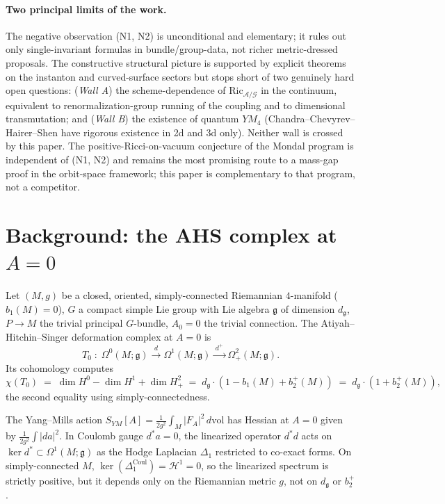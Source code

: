 \documentclass[11pt,letterpaper]{article}
\theoremstyle{definition}
\newcommand{\cA}{\mathcal{A}}
\newcommand{\cG}{\mathcal{G}}
\newcommand{\cH}{\mathcal{H}}
\newcommand{\fg}{\mathfrak{g}}
\newcommand{\Ric}{\mathrm{Ric}}
\newcommand{\dvol}{\,d\mathrm{vol}}
\newcommand{\Lap}{\Delta}
\newcommand{\dimG}{d_{\fg}}
\begin{document}
\paragraph{Two principal limits of the work.} The negative observation (N1, N2) is unconditional and elementary; it rules out only single-invariant formulas in bundle/group-data, not richer metric-dressed proposals. The constructive structural picture is supported by explicit theorems on the instanton and curved-surface sectors but stops short of two genuinely hard open questions: (\emph{Wall A}) the scheme-dependence of $\Ric_{\cA/\cG}$ in the continuum, equivalent to renormalization-group running of the coupling and to dimensional transmutation; and (\emph{Wall B}) the existence of quantum $YM_4$ (Chandra--Chevyrev--Hairer--Shen \cite{CCHS2022, CCHS2024} have rigorous existence in 2d and 3d only). Neither wall is crossed by this paper. The positive-Ricci-on-vacuum conjecture of the Mondal program is independent of (N1, N2) and remains the most promising route to a mass-gap proof in the orbit-space framework; this paper is complementary to that program, not a competitor.

\section{Background: the AHS complex at $A=0$}\label{sec:setup}

Let $(M,g)$ be a closed, oriented, simply-connected Riemannian $4$-manifold ($b_1(M)=0$), $G$ a compact simple Lie group with Lie algebra $\fg$ of dimension $\dimG$, $P\to M$ the trivial principal $G$-bundle, $A_0 = 0$ the trivial connection. The Atiyah--Hitchin--Singer deformation complex at $A=0$ is
\begin{equation}\label{eq:AHS}
T_0 \;:\; \Omega^0(M;\fg) \xrightarrow{\;d\;} \Omega^1(M;\fg) \xrightarrow{\;d^+\;} \Omega^2_+(M;\fg).
\end{equation}
Its cohomology computes
\begin{equation}\label{eq:chiT}
\chi(T_0) \;=\; \dim H^0 - \dim H^1 + \dim H^2_+ \;=\; \dimG\cdot(1 - b_1(M) + b_2^+(M)) \;=\; \dimG\cdot(1+b_2^+(M)),
\end{equation}
the second equality using simply-connectedness.

The Yang--Mills action $S_{YM}[A] = \tfrac{1}{2g^2}\int_M |F_A|^2 \dvol$ has Hessian at $A=0$ given by $\tfrac{1}{2g^2}\int |da|^2$. In Coulomb gauge $d^*a = 0$, the linearized operator $d^*d$ acts on $\ker d^* \subset \Omega^1(M;\fg)$ as the Hodge Laplacian $\Lap_1$ restricted to co-exact forms. On simply-connected $M$, $\ker(\Lap_1^{\mathrm{Coul}}) = \cH^1 = 0$, so the linearized spectrum is strictly positive, but it depends only on the Riemannian metric $g$, not on $\dimG$ or $b_2^+$.
\end{document}
